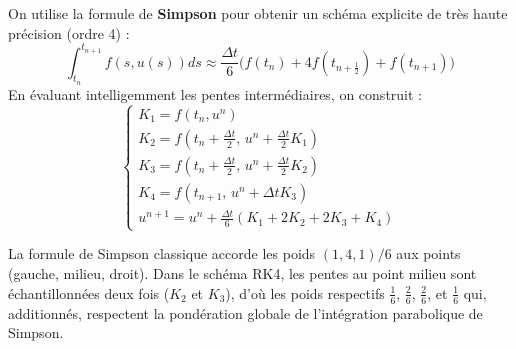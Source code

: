 \begin{algorithme}
    On utilise la formule de \textbf{Simpson} pour obtenir un schéma explicite de très haute précision (ordre 4) :
    \[ \int_{t_n}^{t_{n+1}} f(s, u(s))ds \approx \frac{\Delta t}{6} \Big( f(t_n) + 4f(t_{n+\frac{1}{2}}) + f(t_{n+1}) \Big) \]
    En évaluant intelligemment les pentes intermédiaires, on construit :
    \begin{equation*}
        \begin{cases}
            K_1 = f(t_n, u^n) \\[0.15cm]
            K_2 = f\left(t_n + \frac{\Delta t}{2}, \, u^n + \frac{\Delta t}{2} K_1\right) \\[0.3cm]
            K_3 = f\left(t_n + \frac{\Delta t}{2}, \, u^n + \frac{\Delta t}{2} K_2\right) \\[0.3cm]
            K_4 = f\left(t_{n+1}, \, u^n + \Delta t K_3\right) \\[0.3cm]
            u^{n+1} = u^n + \displaystyle \frac{\Delta t}{6} (K_1 + 2K_2 + 2K_3 + K_4)
        \end{cases}
    \end{equation*}
\end{algorithme}

\begin{explication}
    La formule de Simpson classique accorde les poids $(1, 4, 1)/6$ aux points (gauche, milieu, droit).
    Dans le schéma RK4, les pentes au point milieu sont échantillonnées deux fois ($K_2$ et $K_3$), d'où les poids respectifs $\frac{1}{6}$, $\frac{2}{6}$, $\frac{2}{6}$, et $\frac{1}{6}$ qui, additionnés, respectent la pondération globale de l'intégration parabolique de Simpson.
\end{explication}
